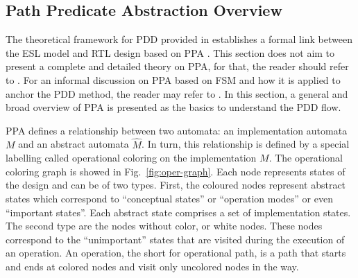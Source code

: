 \subsection{Path Predicate Abstraction Overview}
\label{subsection:PPA}

The theoretical framework for PDD provided in \cite{paper-pdd} establishes a formal link between the ESL model and RTL design based on PPA \cite{paper-ppa}. This section does not aim to present a complete and detailed theory on PPA, for that, the reader should refer to \cite{paper-ppa} . For an informal discussion on PPA based on FSM and how it is applied to anchor the PDD method, the reader may refer to \cite{paper-pdd}. In this section, a general and broad overview of PPA is presented as the basics to understand the PDD flow.

PPA defines a relationship between two automata: an implementation automata $M$ and an abstract automata $\hat{M}$. In turn, this relationship is defined by a special labelling called operational coloring on the implementation $M$. The operational coloring graph is showed in Fig.~\ref{fig:oper-graph}. Each node represents states of the design and can be of two types. First, the coloured nodes represent abstract states which correspond to “conceptual states” or “operation modes” or even “important states”. Each abstract state comprises a set of implementation states. The second type are the nodes without color, or white nodes. These nodes correspond to the “unimportant” states that are visited during the execution of an operation. An operation, the short for operational path, is a path that starts and ends at colored nodes and visit only uncolored nodes in the way.

